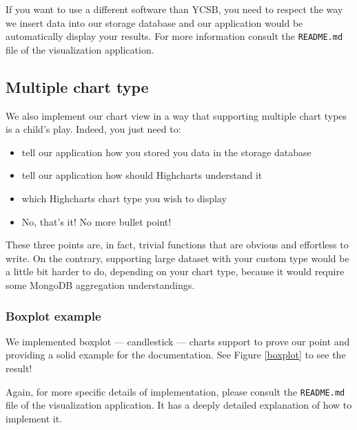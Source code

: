 \documentclass[a4paper,11pt]{report}
\begin{document}
If you want to use a different software than YCSB, you need to respect the way we insert data into our storage database and our application would be automatically display your results. For more information consult the \texttt{README.md} file of the visualization application.

\subsection{Multiple chart type}

We also implement our chart view in a way that supporting multiple chart types is a child's play. Indeed, you just need to:

\begin{itemize}
\item
tell our application how you stored you data in the storage database
\item
tell our application how should Highcharts understand it
\item
which Highcharts chart type you wish to display
\item
No, that's it! No more bullet point!
\end{itemize}

These three points are, in fact, trivial functions that are obvious and effortless to write. On the contrary, supporting large dataset with your custom type would be a little bit harder to do, depending on your chart type, because it would require some MongoDB aggregation understandings.

\subsubsection{Boxplot example}

We implemented boxplot --- candlestick --- charts support to prove our point and providing a solid example for the documentation. See Figure \ref{boxplot} to see the result!

Again, for more specific details of implementation, please consult the \texttt{README.md} file of the visualization application. It has a deeply detailed explanation of how to implement it.
\end{document}
